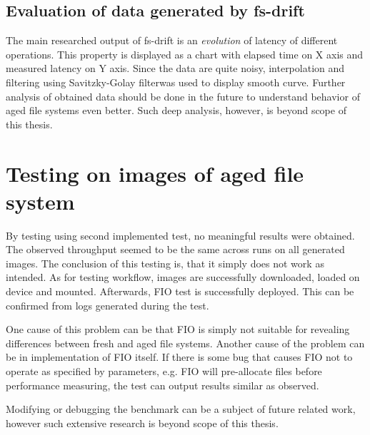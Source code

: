 \documentclass[
  color, %
  table, %
  lof,   %
  lot,   %
]{fithesis3}
\begin{document}
\subsection{Evaluation of data generated by fs-drift}
The main researched output of fs-drift is an \emph{evolution} of latency of different operations. This property is displayed as a chart with elapsed time on X axis and measured latency on Y axis. Since the data are quite noisy, interpolation and filtering using Savitzky-Golay filter\footnotemark[1] was used to display smooth curve. Further analysis of obtained data should be done in the future to understand behavior of aged file systems even better. Such deep analysis, however, is beyond scope of this thesis.

\section{Testing on images of aged file system}
\label{total_hdd}
By testing using second implemented test, no meaningful results were obtained. The observed throughput seemed to be the same across runs on all generated images. The conclusion of this testing is, that it simply does not work as intended. As for testing workflow, images are successfully downloaded, loaded on device and mounted. Afterwards, FIO test is successfully deployed. This can be confirmed from logs generated during the test.

One cause of this problem can be that FIO is simply not suitable for revealing differences between fresh and aged file systems. Another cause of the problem can be in implementation of FIO itself. If there is some bug that causes FIO not to operate as specified by parameters, e.g. FIO will pre-allocate files before performance measuring, the test can output results similar as observed.

Modifying or debugging the benchmark can be a subject of future related work, however such extensive research is beyond scope of this thesis.

\end{document}
